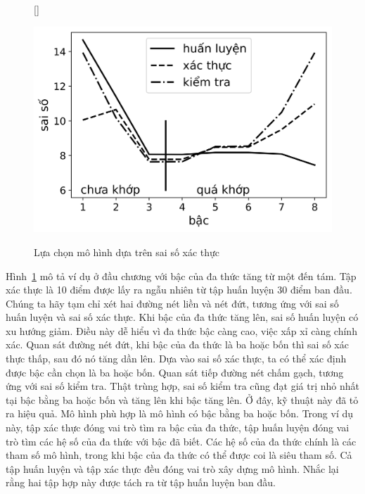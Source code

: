  

\begin{figure}[t]
    [\FBwidth]
    {\caption{   
    Lựa chọn mô hình dựa trên sai số xác thực
    }
    \label{fig:15_validerror}}
    { %
    \includegraphics[width=.5\textwidth]{Chapters/01_Overview/15_overfitting/linreg_val.png}
    }
\end{figure}
Hình~\ref{fig:15_validerror} mô tả ví dụ ở đầu chương với bậc của đa thức tăng
từ một đến tám. Tập xác thực là 10 điểm được lấy ra ngẫu nhiên từ tập huấn luyện
30 điểm ban đầu. Chúng ta hãy tạm chỉ xét hai đường nét liền và nét đứt, tương
ứng với {sai số huấn luyện} và {sai số xác thực}. Khi bậc của đa thức tăng lên,
{sai số huấn luyện} có xu hướng giảm. Điều này dễ hiểu vì đa thức bậc càng cao,
việc xấp xỉ càng chính xác. Quan sát đường nét đứt, khi bậc của đa thức là ba
hoặc bốn thì {sai số xác thực} thấp, sau đó nó tăng dần lên. Dựa vào
{sai số xác thực}, ta có thể xác định được bậc cần chọn là ba hoặc bốn. Quan
sát tiếp đường nét chấm gạch, tương ứng với {sai số kiểm tra}. Thật trùng hợp, sai số kiểm tra cũng đạt giá trị nhỏ nhất tại bậc bằng ba hoặc bốn và tăng lên khi bậc
tăng lên. Ở đây, kỹ thuật này đã tỏ ra hiệu quả. Mô hình phù hợp là mô hình có
bậc bằng ba hoặc bốn. Trong ví dụ này, tập xác thực đóng vai trò tìm ra bậc
của đa thức, tập huấn luyện đóng vai trò tìm các hệ số của đa thức
với bậc đã biết. Các hệ số của đa thức chính là các tham số mô hình,
trong khi bậc của đa thức có thể được coi là {siêu tham số}. Cả tập
huấn luyện và tập xác thực đều đóng vai trò xây dựng mô hình. Nhắc lại rằng
hai tập hợp này được tách ra từ tập huấn luyện ban đầu.
 

